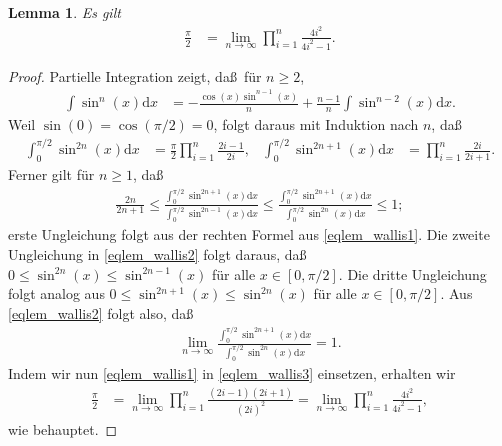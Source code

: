 \documentclass[10pt,reqno]{amsart}
\numberwithin{equation}{section}
\newcommand\dd{{\mathrm d}}
\newtheorem{lemma}[definition]{Lemma}
\begin{document}
\begin{lemma}\label{lem_wallis}
	Es gilt
	\begin{align*}
		\frac{\pi}2&=\lim_{n\to\infty}\prod_{i=1}^n\frac{4i^2}{4i^2-1}.
	\end{align*}
\end{lemma}
\begin{proof}
	Partielle Integration zeigt, da\ss\ f\"ur $n\geq2$,
	\begin{align*}
		\int\sin^n(x)\dd x&=-\frac{\cos(x)\sin^{n-1}(x)}n+\frac{n-1}n\int\sin^{n-2}(x)\dd x.
	\end{align*}
	Weil $\sin(0)=\cos(\pi/2)=0$, folgt daraus mit Induktion nach $n$, da\ss
	\begin{align}\label{eqlem_wallis1}
		\int_0^{\pi/2}\sin^{2n}(x)\dd x&=\frac\pi2\prod_{i=1}^n\frac{2i-1}{2i},&
		\int_0^{\pi/2}\sin^{2n+1}(x)\dd x&=\prod_{i=1}^n\frac{2i}{2i+1}.
	\end{align}
	Ferner gilt f\"ur $n\geq1$, da\ss\
	\begin{align}\label{eqlem_wallis2}
		\frac{2n}{2n+1}\leq\frac{\int_0^{\pi/2}\sin^{2n+1}(x)\dd x}{\int_0^{\pi/2}\sin^{2n-1}(x)\dd x}\leq\frac{\int_0^{\pi/2}\sin^{2n+1}(x)\dd x}{\int_0^{\pi/2}\sin^{2n}(x)\dd x}\leq1;
	\end{align}
	erste Ungleichung folgt aus der rechten Formel aus \eqref{eqlem_wallis1}.
	Die zweite Ungleichung in \eqref{eqlem_wallis2} folgt daraus, da\ss\ $0\leq\sin^{2n}(x)\leq\sin^{2n-1}(x)$ f\"ur alle $x\in[0,\pi/2]$.
	Die dritte Ungleichung folgt analog aus $0\leq\sin^{2n+1}(x)\leq\sin^{2n}(x)$ f\"ur alle $x\in[0,\pi/2]$.
	Aus \eqref{eqlem_wallis2} folgt also, da\ss
	\begin{align}\label{eqlem_wallis3}
		\lim_{n\to\infty}\frac{\int_0^{\pi/2}\sin^{2n+1}(x)\dd x}{\int_0^{\pi/2}\sin^{2n}(x)\dd x}=1.
	\end{align}
	Indem wir nun \eqref{eqlem_wallis1} in \eqref{eqlem_wallis3} einsetzen, erhalten wir
	\begin{align*}
		\frac\pi2&=\lim_{n\to\infty}\prod_{i=1}^n\frac{(2i-1)(2i+1)}{(2i)^2}=\lim_{n\to\infty}\prod_{i=1}^n\frac{4i^2}{4i^2-1},
	\end{align*}
	wie behauptet.
\end{proof}
\end{document}
